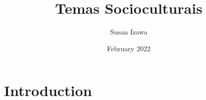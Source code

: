 \documentclass{article}
\title{Temas Socioculturais}
\author{Susan Izawa}
\date{February 2022}
\begin{document}
\maketitle

\tableofcontents

\section{Introduction}
\end{document}
